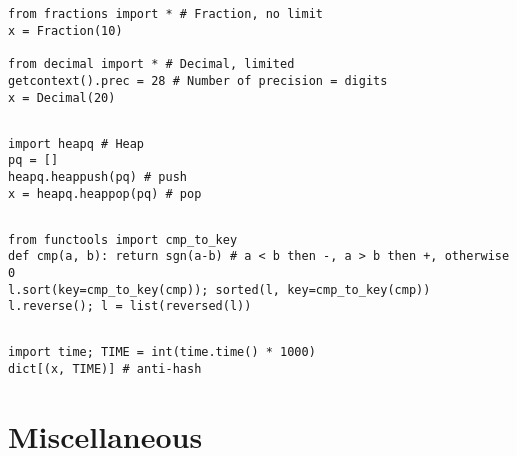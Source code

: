 \documentclass[landscape, 8pt, a4paper, oneside, twocolumn]{extarticle}
\begin{document}
\subsection{}
\begin{verbatim}
from fractions import * # Fraction, no limit
x = Fraction(10)

from decimal import * # Decimal, limited
getcontext().prec = 28 # Number of precision = digits
x = Decimal(20)
\end{verbatim}
\subsection{}
\begin{verbatim}
import heapq # Heap
pq = []
heapq.heappush(pq) # push
x = heapq.heappop(pq) # pop
\end{verbatim}
\subsection{}
\begin{verbatim}
from functools import cmp_to_key
def cmp(a, b): return sgn(a-b) # a < b then -, a > b then +, otherwise 0
l.sort(key=cmp_to_key(cmp)); sorted(l, key=cmp_to_key(cmp))
l.reverse(); l = list(reversed(l))
\end{verbatim}
\subsection{}
\begin{verbatim}
import time; TIME = int(time.time() * 1000)
dict[(x, TIME)] # anti-hash
\end{verbatim}
\section{Miscellaneous}
\subsection{}
\subsection{}
\subsection{}

\end{document}

